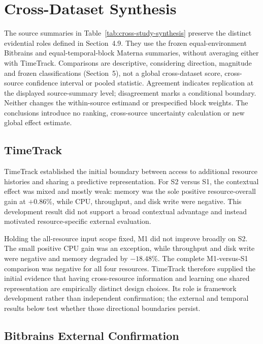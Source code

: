 \documentclass[a4paper,fleqn]{cas-dc}
\begin{document}
\section{Cross-Dataset Synthesis}
\label{sec:cross-dataset-synthesis}

The source summaries in Table~\ref{tab:cross-study-synthesis} preserve the
distinct evidential roles defined in Section~4.9. They use the frozen
equal-environment Bitbrains and equal-temporal-block Materna summaries,
without averaging either with TimeTrack. Comparisons are descriptive,
considering direction, magnitude and frozen classifications (Section~5), not
a global cross-dataset score, cross-source confidence interval or pooled
statistic. Agreement indicates replication at the displayed source-summary
level; disagreement marks a conditional boundary. Neither changes the
within-source estimand or prespecified block weights. The conclusions
introduce no ranking, cross-source uncertainty calculation or new global
effect estimate.



\subsection{TimeTrack}

TimeTrack established the initial boundary between access to additional
resource histories and sharing a predictive representation. For S2 versus S1,
the contextual effect was mixed and mostly weak: memory was the sole positive
resource-overall gain at $+0.86\%$, while CPU, throughput, and disk write were
negative. This development result did not support a broad contextual advantage
and instead motivated resource-specific external evaluation.

Holding the all-resource input scope fixed, M1 did not improve broadly on S2.
The small positive CPU gain was an exception, while throughput and disk write
were negative and memory degraded by $-18.48\%$. The complete M1-versus-S1
comparison was negative for all four resources. TimeTrack therefore supplied
the initial evidence that having cross-resource information and learning one
shared representation are empirically distinct design choices. Its role is
framework development rather than independent confirmation; the external and
temporal results below test whether those directional boundaries persist.

\subsection{Bitbrains External Confirmation}
\end{document}

